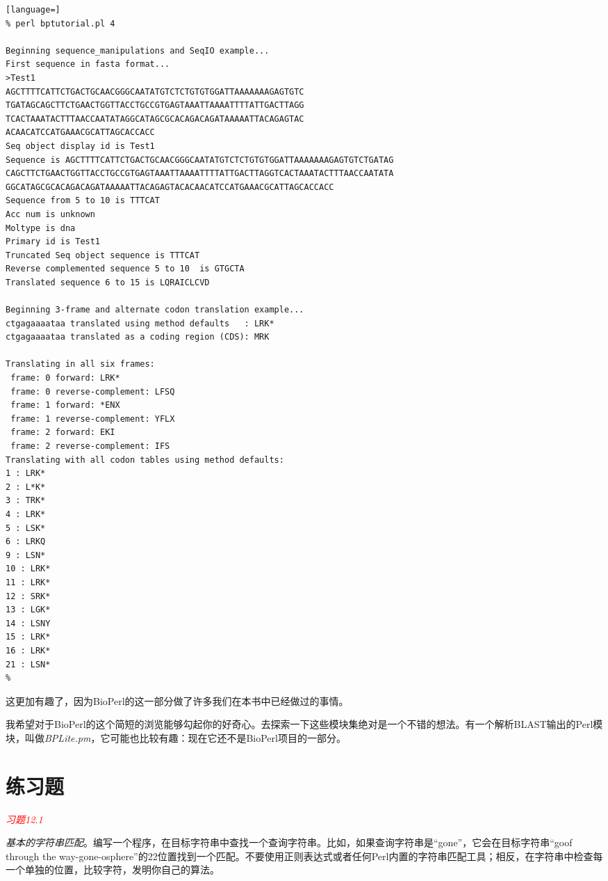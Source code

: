 \begin{lstlisting}[language=]
% perl bptutorial.pl 4

Beginning sequence_manipulations and SeqIO example... 
First sequence in fasta format... 
>Test1
AGCTTTTCATTCTGACTGCAACGGGCAATATGTCTCTGTGTGGATTAAAAAAAGAGTGTC
TGATAGCAGCTTCTGAACTGGTTACCTGCCGTGAGTAAATTAAAATTTTATTGACTTAGG
TCACTAAATACTTTAACCAATATAGGCATAGCGCACAGACAGATAAAAATTACAGAGTAC
ACAACATCCATGAAACGCATTAGCACCACC
Seq object display id is Test1
Sequence is AGCTTTTCATTCTGACTGCAACGGGCAATATGTCTCTGTGTGGATTAAAAAAAGAGTGTCTGATAG
CAGCTTCTGAACTGGTTACCTGCCGTGAGTAAATTAAAATTTTATTGACTTAGGTCACTAAATACTTTAACCAATATA
GGCATAGCGCACAGACAGATAAAAATTACAGAGTACACAACATCCATGAAACGCATTAGCACCACC 
Sequence from 5 to 10 is TTTCAT 
Acc num is unknown 
Moltype is dna 
Primary id is Test1 
Truncated Seq object sequence is TTTCAT 
Reverse complemented sequence 5 to 10  is GTGCTA  
Translated sequence 6 to 15 is LQRAICLCVD 

Beginning 3-frame and alternate codon translation example... 
ctgagaaaataa translated using method defaults   : LRK*
ctgagaaaataa translated as a coding region (CDS): MRK

Translating in all six frames:
 frame: 0 forward: LRK*
 frame: 0 reverse-complement: LFSQ
 frame: 1 forward: *ENX
 frame: 1 reverse-complement: YFLX
 frame: 2 forward: EKI
 frame: 2 reverse-complement: IFS
Translating with all codon tables using method defaults:
1 : LRK*
2 : L*K*
3 : TRK*
4 : LRK*
5 : LSK*
6 : LRKQ
9 : LSN*
10 : LRK*
11 : LRK*
12 : SRK*
13 : LGK*
14 : LSNY
15 : LRK*
16 : LRK*
21 : LSN*
% 
\end{lstlisting}

这更加有趣了，因为BioPerl的这一部分做了许多我们在本书中已经做过的事情。

我希望对于BioPerl的这个简短的浏览能够勾起你的好奇心。去探索一下这些模块集绝对是一个不错的想法。有一个解析BLAST输出的Perl模块，叫做\textit{BPLite.pm}，它可能也比较有趣：现在它还不是BioPerl项目的一部分。

\section{练习题}
\textcolor{red}{\textit{习题12.1}}
\begin{adjustwidth}{4em}{}
\textit{基本的字符串匹配}。编写一个程序，在目标字符串中查找一个查询字符串。比如，如果查询字符串是“gone”，它会在目标字符串“goof through the way-gone-osphere”的22位置找到一个匹配。不要使用正则表达式或者任何Perl内置的字符串匹配工具；相反，在字符串中检查每一个单独的位置，比较字符，发明你自己的算法。
\end{adjustwidth}

